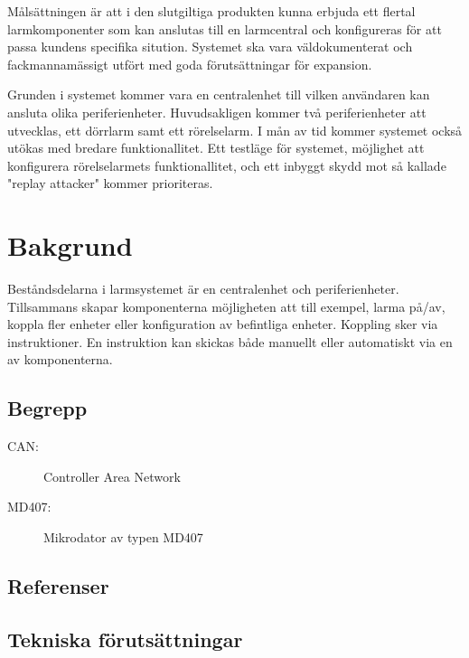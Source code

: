 \documentclass[a4paper]{article}
\begin{document}

Målsättningen är att i den slutgiltiga produkten kunna erbjuda ett flertal larmkomponenter som kan anslutas till en larmcentral och konfigureras för att passa kundens specifika sitution. Systemet ska vara väldokumenterat och fackmannamässigt utfört med goda förutsättningar för expansion.

Grunden i systemet kommer vara en centralenhet till vilken användaren kan ansluta olika periferienheter. Huvudsakligen kommer två periferienheter att utvecklas, ett dörrlarm samt ett rörelselarm. I mån av tid kommer systemet också utökas med bredare funktionallitet. Ett testläge för systemet, möjlighet att konfigurera rörelselarmets funktionallitet, och ett inbyggt skydd mot så kallade "replay attacker" kommer prioriteras.


\section{Bakgrund}

Beståndsdelarna i larmsystemet är en centralenhet och periferienheter. Tillsammans skapar komponenterna möjligheten att till exempel, larma på/av, koppla fler enheter eller konfiguration av befintliga enheter. Koppling sker via instruktioner. En instruktion kan skickas både manuellt eller automatiskt via en av komponenterna.

\subsection{Begrepp}

\begin{description}
    \item[CAN:] Controller Area Network
    \item[MD407:] Mikrodator av typen MD407
\end{description}

\subsection{Referenser}

\subsection{Tekniska förutsättningar}
\end{document}
